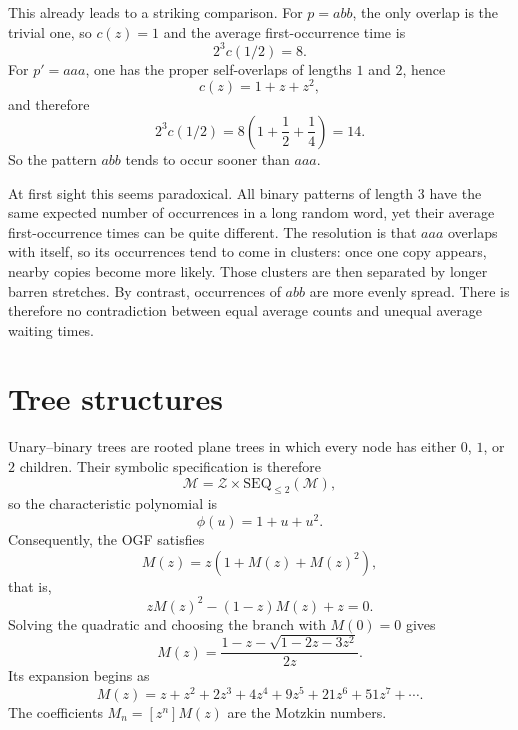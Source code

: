 This already leads to a striking comparison. For $p = abb$, the only overlap is the trivial one,
so $c(z) = 1$ and the average first-occurrence time is
\begin{equation*}
    2^{3} c(1/2) = 8.
\end{equation*}
For $p' = aaa$, one has the proper self-overlaps of lengths $1$ and $2$, hence
\begin{equation*}
    c(z) = 1 + z + z^{2},
\end{equation*}
and therefore
\begin{equation*}
    2^{3} c(1/2) = 8\left(1 + \frac{1}{2} + \frac{1}{4}\right) = 14.
\end{equation*}
So the pattern $abb$ tends to occur sooner than $aaa$.

At first sight this seems paradoxical. All binary patterns of length $3$ have the same expected
number of occurrences in a long random word, yet their average first-occurrence times can be
quite different. The resolution is that $aaa$ overlaps with itself, so its occurrences tend to come
in clusters: once one copy appears, nearby copies become more likely. Those clusters are then
separated by longer barren stretches. By contrast, occurrences of $abb$ are more evenly spread.
There is therefore no contradiction between equal average counts and unequal average waiting
times.

\section{Tree structures}

Unary--binary trees are rooted plane trees in which every node has either $0$, $1$, or $2$
children. Their symbolic specification is therefore
\begin{equation*}
    \mathcal{M} = \mathcal{Z} \times \mathrm{SEQ}_{\leq 2}(\mathcal{M}),
\end{equation*}
so the characteristic polynomial is
\begin{equation*}
    \phi(u) = 1 + u + u^{2}.
\end{equation*}
Consequently, the OGF satisfies
\begin{equation*}
    M(z) = z(1 + M(z) + M(z)^{2}),
\end{equation*}
that is,
\begin{equation*}
    zM(z)^{2} - (1 - z)M(z) + z = 0.
\end{equation*}
Solving the quadratic and choosing the branch with $M(0) = 0$ gives
\begin{equation*}
    M(z) = \frac{1 - z - \sqrt{1 - 2z - 3z^{2}}}{2z}.
\end{equation*}
Its expansion begins as
\begin{equation*}
    M(z) = z + z^{2} + 2z^{3} + 4z^{4} + 9z^{5} + 21z^{6} + 51z^{7} + \cdots.
\end{equation*}
The coefficients $M_{n} = [z^{n}]M(z)$ are the Motzkin numbers.

